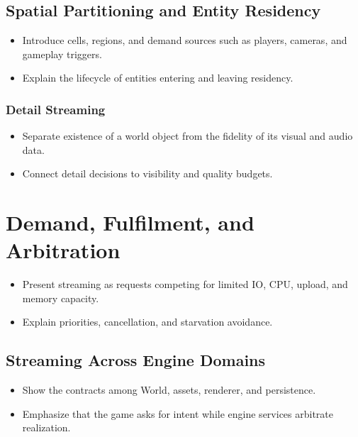 \documentclass[
  11pt,
  letterpaper,
  DIV=11,
  numbers=noendperiod,
  twoside,
  open=right]{scrreprt}
\providecommand{\tightlist}{%
  \setlength{\itemsep}{0pt}\setlength{\parskip}{0pt}}
\begin{document}
\subsection{Spatial Partitioning and Entity
Residency}\label{spatial-partitioning-and-entity-residency}

\begin{itemize}
\tightlist
\item
  Introduce cells, regions, and demand sources such as players, cameras,
  and gameplay triggers.
\item
  Explain the lifecycle of entities entering and leaving residency.
\end{itemize}

\subsubsection{Detail Streaming}\label{detail-streaming}

\begin{itemize}
\tightlist
\item
  Separate existence of a world object from the fidelity of its visual
  and audio data.
\item
  Connect detail decisions to visibility and quality budgets.
\end{itemize}

\section{Demand, Fulfilment, and
Arbitration}\label{demand-fulfilment-and-arbitration}

\begin{itemize}
\tightlist
\item
  Present streaming as requests competing for limited IO, CPU, upload,
  and memory capacity.
\item
  Explain priorities, cancellation, and starvation avoidance.
\end{itemize}

\subsection{Streaming Across Engine
Domains}\label{streaming-across-engine-domains}

\begin{itemize}
\tightlist
\item
  Show the contracts among World, assets, renderer, and persistence.
\item
  Emphasize that the game asks for intent while engine services
  arbitrate realization.
\end{itemize}
\end{document}
